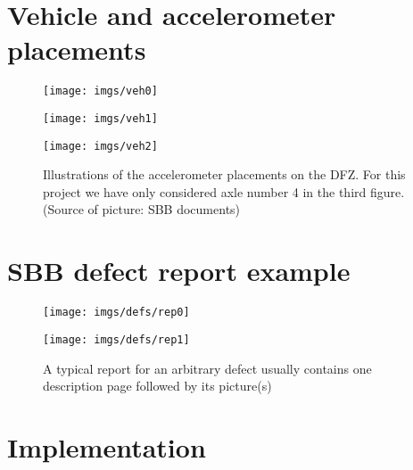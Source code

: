\section{Vehicle and accelerometer placements}
\label{figs:veh}
\begin{figure}[H]
	\centering
	\texttt{[image: imgs/veh0]}
	\label{fig:veh0}
	
	\texttt{[image: imgs/veh1]}
	\label{fig:veh1}
	
	\texttt{[image: imgs/veh2]}
	\caption{Illustrations of the accelerometer placements on the DFZ. For this project we have only considered axle number 4 in the third figure. (Source of picture: SBB documents)}
	\label{fig:veh2}
\end{figure}

\section{SBB defect report example}
\label{app:report}
\begin{figure}[H]
	\centering
	\texttt{[image: imgs/defs/rep0]}
	\caption{}
	\texttt{[image: imgs/defs/rep1]}
	\caption{A typical report for an arbitrary defect usually contains one description page followed by its picture(s)}
	\label{fig:veh2}
\end{figure}



\section{Implementation}

